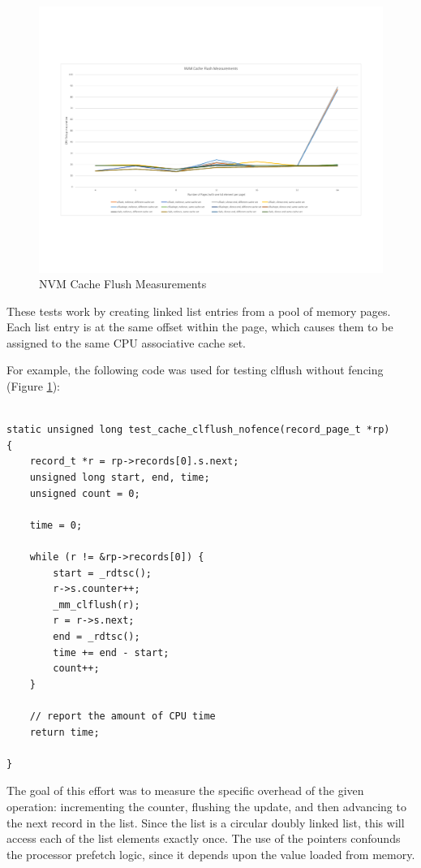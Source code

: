 \begin{figure}
    \centering
    \caption{NVM Cache Flush Measurements}\label{micro:cache-flush}
    \includegraphics[scale=0.35]{micro/nvm-cache-flush-measurements.pdf}
\end{figure}

These tests work by creating linked list entries from a pool
of memory pages.  Each list entry is at the same offset within
the page, which causes them to be assigned to the same CPU
associative cache set. 

For example, the following code was used for testing clflush
without fencing (Figure \ref{micro:cache-flush}):

\begin{verbatim}
    
static unsigned long test_cache_clflush_nofence(record_page_t *rp)
{
    record_t *r = rp->records[0].s.next;
    unsigned long start, end, time;
    unsigned count = 0;

    time = 0;

    while (r != &rp->records[0]) {
        start = _rdtsc();
        r->s.counter++;
        _mm_clflush(r);
        r = r->s.next;
        end = _rdtsc();
        time += end - start;
        count++;
    }

    // report the amount of CPU time
    return time;

}
\end{verbatim}

The goal of this effort was to measure the specific overhead of
the given operation: incrementing the counter, flushing the update, and then advancing to the next record in the list.
Since the list is a circular doubly linked list, this will
access each of the list elements exactly once.  The use of
the pointers confounds the processor prefetch logic, since it
depends upon the value loaded from memory.

